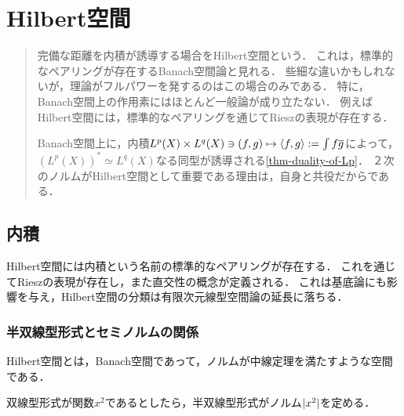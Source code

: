 \documentclass[uplatex,dvipdfmx]{jsreport}
\begin{document}
\chapter{Hilbert空間}

\begin{quotation}
    完備な距離を内積が誘導する場合をHilbert空間という．
    これは，標準的なペアリングが存在するBanach空間論と見れる．
    些細な違いかもしれないが，理論がフルパワーを発するのはこの場合のみである．
    特に，Banach空間上の作用素にはほとんど一般論が成り立たない．
    例えばHilbert空間には，標準的なペアリングを通じてRieszの表現が存在する．

    Banach空間上に，内積$L^p(X)\times L^q(X)\ni(f,g)\mapsto\langle f,g\rangle:=\int f\overline{g}$によって，
    $(L^p(X))^*\simeq L^q(X)$なる同型が誘導される\ref{thm-duality-of-Lp}．
    ２次のノルムがHilbert空間として重要である理由は，自身と共役だからである．
\end{quotation}

\section{内積}

\begin{tcolorbox}[colframe=ForestGreen, colback=ForestGreen!10!white,breakable,colbacktitle=ForestGreen!40!white,coltitle=black,fonttitle=\bfseries\sffamily,
title=]
    Hilbert空間には内積という名前の標準的なペアリングが存在する．
    これを通じてRieszの表現が存在し，また直交性の概念が定義される．
    これは基底論にも影響を与え，Hilbert空間の分類は有限次元線型空間論の延長に落ちる．
\end{tcolorbox}

\subsection{半双線型形式とセミノルムの関係}

\begin{tcolorbox}[colframe=ForestGreen, colback=ForestGreen!10!white,breakable,colbacktitle=ForestGreen!40!white,coltitle=black,fonttitle=\bfseries\sffamily,
title=]
    Hilbert空間とは，Banach空間であって，ノルムが中線定理を満たすような空間である．

    双線型形式が関数$x^2$であるとしたら，半双線型形式がノルム$\lvert x^2\rvert$を定める．
\end{tcolorbox}
\end{document}
